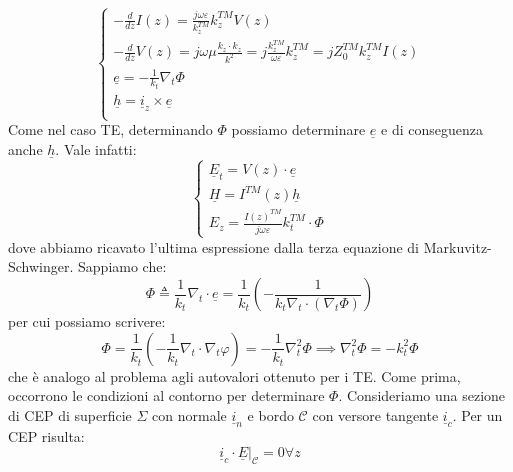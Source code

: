 \documentclass{book}
\begin{document}
    \begin{equation}
        \begin{cases}
            \displaystyle -\frac{d}{dz}I(z) = \frac{j \omega \varepsilon}{k_{z} ^{TM}}k_{z} ^{TM} V(z) \\
            \displaystyle -\frac{d}{dz}V(z) = j \omega \mu \frac{k_{z} \cdot k_{z}}{k^{2}} = j \frac{k_{z} ^{TM}}{\omega \varepsilon} k_{z} ^{TM} = j Z_{0} ^{TM}k_{z} ^{TM} I(z) \\
            \displaystyle \underline{e} = -\frac{1}{k_{t}} \nabla_{t} \Phi \\
            \displaystyle \underline{h} = \underline{i}_{z} \times \underline{e} \\
        \end{cases}
    \end{equation}
    Come nel caso TE, determinando $\Phi$ possiamo determinare $\underline{e}$ e di conseguenza anche $\underline{h}$. Vale infatti:
    \begin{equation}
        \begin{cases}
            \underline{E}_{t} = V(z) \cdot \underline{e} \\
            \underline{H} = I^{TM} (z) \underline{h} \\
            E_{z} = \frac{I(z) ^{TM}}{j \omega \varepsilon}k_{t} ^{TM} \cdot \Phi
        \end{cases}
    \end{equation}
    dove abbiamo ricavato l'ultima espressione dalla terza equazione di Markuvitz-Schwinger. Sappiamo che:
    \begin{equation}
        \Phi  \triangleq  \frac{1}{k_{t}} \nabla_{t} \cdot \underline{e} = \frac{1}{k_{t}} (- \frac{1}{k_{t} \nabla_{t} \cdot (\nabla_{t} \Phi)})
    \end{equation}
    per cui possiamo scrivere:
    \begin{equation}
        \Phi = \frac{1}{k_{t}} ( -\frac{1}{k_{t}} \nabla_{t} \cdot \nabla_{t} \varphi) = - \frac{1}{k_{t}} \nabla _{t} ^{2} \Phi \implies \nabla_{t} ^{2} \Phi = - k_{t} ^{2} \Phi
    \end{equation}
    che è analogo al problema agli autovalori ottenuto per i TE. Come prima, occorrono le condizioni al contorno per determinare $\Phi$. Consideriamo 
    una sezione di CEP di superficie $\Sigma$ con normale $\underline{i}_{n}$ e bordo $\mathcal{C}$ con versore tangente $\underline{i}_{c}$. Per un CEP risulta:
    \begin{equation}
        \underline{i}_{c} \cdot \underline{E}|_{\mathcal{C}} = 0 \forall z
    \end{equation}
\end{document}
